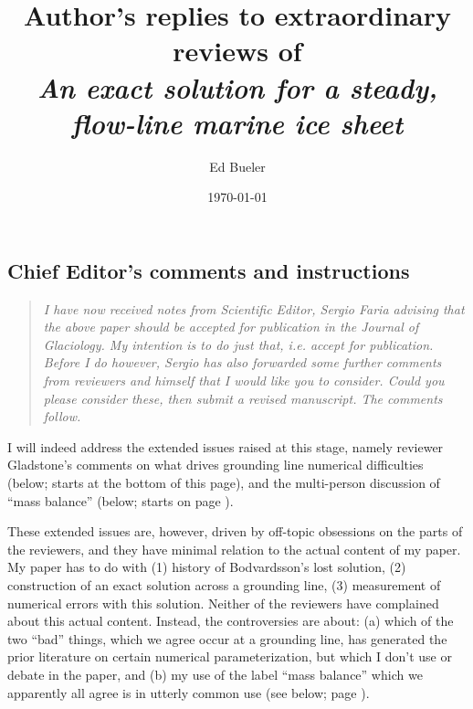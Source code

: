 \documentclass[11pt,reqno]{amsart}
\title[Author's replies to extraordinary reviews of \emph{An exact solution \dots}]{Author's replies to extraordinary reviews of \\ \emph{An exact solution for a steady, flow-line marine ice sheet}}
\author{Ed Bueler}
\date{\today}
\begin{document}
\maketitle

\thispagestyle{empty}



\subsection*{Chief Editor's comments and instructions}  \begin{quote}
\emph{I have now received notes from Scientific Editor, Sergio Faria advising that the above paper should be accepted for publication in the Journal of Glaciology.  My intention is to do just that, i.e. accept for publication.  Before I do however, Sergio has also forwarded some further comments from reviewers and himself that I would like you to consider.  Could you please consider these, then submit a revised manuscript.  The comments follow.}
\end{quote}

\medskip
\noindent I will indeed address the extended issues raised at this stage, namely reviewer Gladstone's comments on what drives grounding line numerical difficulties (below; starts at the bottom of this page), and the multi-person discussion of ``mass balance'' (below; starts on page \pageref{mb}).

\medskip
\noindent These extended issues are, however, driven by off-topic obsessions on the parts of the reviewers, and they have minimal relation to the actual content of my paper.  My paper has to do with (1) history of Bodvardsson's lost solution, (2) construction of an exact solution across a grounding line, (3) measurement of numerical errors with this solution.  Neither of the reviewers have complained about this actual content.  Instead, the controversies are about: (a) which of the two ``bad'' things, which we agree occur at a grounding line, has generated the prior literature on certain numerical parameterization, but which I don't use or debate in the paper, and (b) my use of the label ``mass balance'' which we apparently all agree is in utterly common use (see below; page \pageref{mb}).
\end{document}
